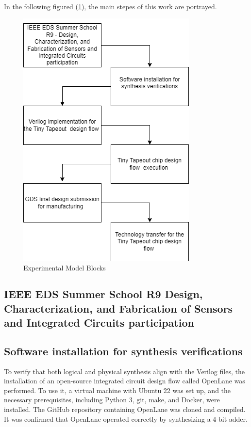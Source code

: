  In the following figured (\ref{fig:ExpModelBlocks}), the main stepes of this work are portrayed.
\begin{figure}[H]
    \centering
    \includegraphics[scale=0.6]{Pictures/ExperimentalModel.png}
    \caption{Experimental Model Blocks}
    \label{fig:ExpModelBlocks}
\end{figure}

\subsection{IEEE EDS Summer School R9 \- Design, Characterization, and Fabrication of Sensors and Integrated Circuits participation}


\subsection{Software installation for synthesis verifications}

To verify that both logical and physical synthesis align with the Verilog files, the installation of an  open-source integrated circuit design flow called OpenLane was performed. To use it, a virtual machine with Ubuntu 22 was set up, and the necessary prerequisites, including Python 3, git, make, and Docker, were installed. The GitHub repository containing OpenLane was cloned and compiled. It was confirmed that OpenLane operated correctly by synthesizing a 4-bit adder.
 

